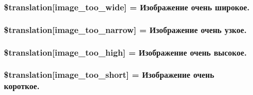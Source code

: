 \subsubsection[{\$translation}]{\setlength{\rightskip}{0pt plus 5cm}\$translation\mbox{[}\textquotesingle{}image\+\_\+too\+\_\+wide\textquotesingle{}\mbox{]} = \textquotesingle{}Изображение очень широкое.\textquotesingle{}}\label{class_8upload_8ru___r_u_8php_a0dd3e4930ca1f59ae280f4b1006525cd}
\hypertarget{class_8upload_8ru___r_u_8php_a5c9a4cd67fd21c32e0a3b434591a6037}{}
\subsubsection[{\$translation}]{\setlength{\rightskip}{0pt plus 5cm}\$translation\mbox{[}\textquotesingle{}image\+\_\+too\+\_\+narrow\textquotesingle{}\mbox{]} = \textquotesingle{}Изображение очень узкое.\textquotesingle{}}\label{class_8upload_8ru___r_u_8php_a5c9a4cd67fd21c32e0a3b434591a6037}
\hypertarget{class_8upload_8ru___r_u_8php_aa27bde361343f3b63c7cd441860024f8}{}
\subsubsection[{\$translation}]{\setlength{\rightskip}{0pt plus 5cm}\$translation\mbox{[}\textquotesingle{}image\+\_\+too\+\_\+high\textquotesingle{}\mbox{]} = \textquotesingle{}Изображение очень высокое.\textquotesingle{}}\label{class_8upload_8ru___r_u_8php_aa27bde361343f3b63c7cd441860024f8}
\hypertarget{class_8upload_8ru___r_u_8php_a86fcd4e1157b00032df451188d735527}{}
\subsubsection[{\$translation}]{\setlength{\rightskip}{0pt plus 5cm}\$translation\mbox{[}\textquotesingle{}image\+\_\+too\+\_\+short\textquotesingle{}\mbox{]} = \textquotesingle{}Изображение очень короткое.\textquotesingle{}}\label{class_8upload_8ru___r_u_8php_a86fcd4e1157b00032df451188d735527}
\hypertarget{class_8upload_8ru___r_u_8php_a23396f6ce7f31e5e5f1b57580621d982}{}
